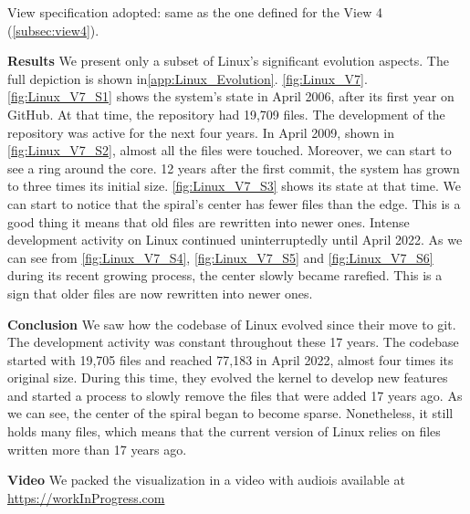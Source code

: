 View specification adopted: same as the one defined for the View 4 (\autoref{subsec:view4}).

\textbf{Results}
We present only a subset of Linux's significant evolution aspects. The full depiction is shown in\autoref{app:Linux_Evolution}. \autoref{fig:Linux_V7}. \autoref{fig:Linux_V7_S1} shows the system's state in April 2006, after its first year on GitHub. At that time, the repository had 19,709 files. The development of the repository was active for the next four years. In April 2009, shown in \autoref{fig:Linux_V7_S2}, almost all the files were touched. Moreover, we can start to see a ring around the core. 
12 years after the first commit, the system has grown to three times its initial size. \autoref{fig:Linux_V7_S3} shows its state at that time. We can start to notice that the spiral's center has fewer files than the edge. This is a good thing it means that old files are rewritten into newer ones. Intense development activity on Linux continued uninterruptedly until April 2022. As we can see from \autoref{fig:Linux_V7_S4}, \autoref{fig:Linux_V7_S5} and \autoref{fig:Linux_V7_S6} during its recent growing process, the center slowly became rarefied. This is a sign that older files are now rewritten into newer ones. 

\bigbreak
\textbf{Conclusion}
 We saw how the codebase of Linux evolved since their move to git. The development activity was constant throughout these 17 years. The codebase started with 19,705 files and reached 77,183 in April 2022, almost four times its original size. During this time, they evolved the kernel to develop new features and started a process to slowly remove the files that were added 17 years ago. As we can see, the center of the spiral began to become sparse. Nonetheless, it still holds many files, which means that the current version of Linux relies on files written more than 17 years ago. 

\bigbreak
\textbf{Video}
We packed the visualization in a video with audiois available at \url{https://workInProgress.com}


